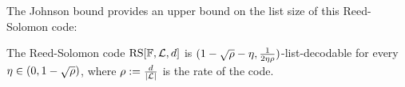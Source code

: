     \noindent
    The Johnson bound provides an upper bound on the list size of this Reed-Solomon code:
    
    \begin{theorem}\label{thm:johnson_bnd}
    \leanok
    The Reed-Solomon code $\mathrm{RS}[\mathbb{F},\mathcal{L},d]$ is $(1-\sqrt{\rho}-\eta,\frac{1}{2\eta\rho})$-list-decodable for every $\eta\in(0,1-\sqrt{\rho})$, where $\rho:=\frac{d}{|\mathcal{L}|}$ is the rate of the code.
    \end{theorem}
    